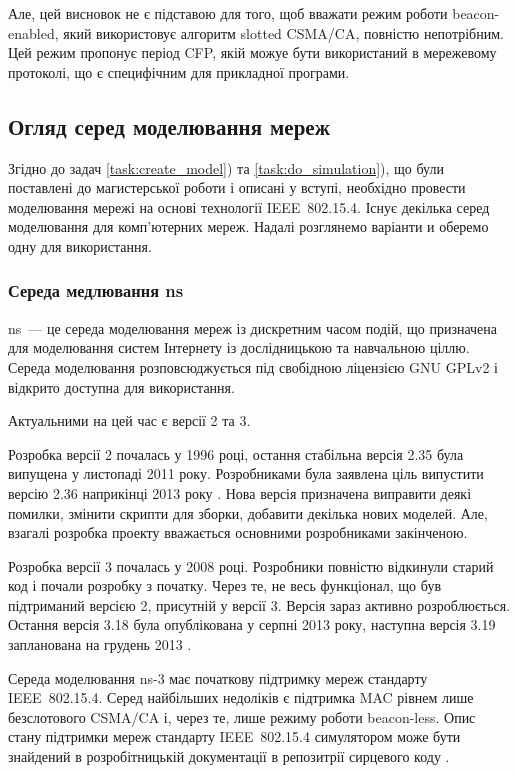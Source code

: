 \documentclass[a4paper,ukrainian,utf8,nocolumnsxix,floatsection,equationsection]{eskdtext}
\renewcommand\paragraph{\subsubsection}
\newcommand{\iee}[0]{IEEE~802.15.4\xspace}
\newcommand{\csma}[0]{CSMA/CA\xspace}
\newcommand{\scsma}[0]{slotted \csma\xspace}
\newcommand{\blm}[0]{beacon-less\xspace}
\newcommand{\bem}[0]{beacon-enabled\xspace}
\begin{document}
Але, цей висновок не є підставою для того, щоб вважати режим роботи \bem, який використовує алгоритм \scsma{}, повністю непотрібним. Цей режим пропонує період CFP, якій можуе бути використаний в мережевому протоколі, що є специфічним для прикладної програми.

\subsection{Огляд серед моделювання мереж}

Згідно до задач \ref{task:create_model}) та \ref{task:do_simulation}), що були поставлені до магистерської роботи і описані у вступі, необхідно провести моделювання мережі на основі технології \iee. Існує декілька серед моделювання для комп'ютерних мереж. Надалі розглянемо варіанти и оберемо одну для використання.

\paragraph{Середа медлювання ns}
\label{par:ns}

ns~--- це середа моделювання мереж із дискретним часом подій, що призначена для моделювання систем Інтернету із дослідницькою та навчальною ціллю. Середа моделювання розповсюджується під свобідною ліцензією GNU GPLv2 і відкрито доступна для використання.


Актуальними на цей час є версії 2 та 3. 

Розробка версії 2 почалась у 1996 році, остання стабільна версія 2.35 була випущена у листопаді 2011 року. Розробниками була заявлена ціль випустити версію 2.36 наприкінці 2013 року \cite{nsnam:roadmap}. Нова версія призначена виправити деякі помилки, змінити скрипти для зборки, добавити декілька нових моделей. Але, взагалі розробка проекту вважається основними розробниками закінченою.

Розробка версії 3 почалась у 2008 році. Розробники повністю відкинули старий код і почали розробку з початку. Через те, не весь функціонал, що був підтриманий версією 2, присутній у версії 3. Версія зараз активно розроблюється. Остання версія 3.18 була опублікована у серпні 2013 року, наступна версія 3.19 запланована на грудень 2013 \cite{nsnam:current:development}.  

Середа моделювання ns-3 має початкову підтримку мереж стандарту \iee. Серед найбільших недоліків є підтримка MAC рівнем лише безслотового \csma і, через те, лише режиму роботи \blm. Опис стану підтримки мереж стандарту \iee симулятором може бути знайдений в розробітницькій  документації в репозитрії сирцевого коду \cite{ns3:lrwpan}.
\end{document}
